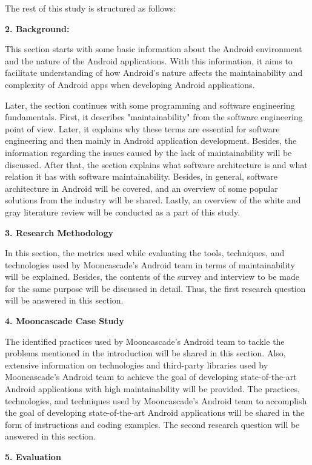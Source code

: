 The rest of this study is structured as follows:

\noindent\textbf{2. Background:}

This section starts with some basic information about the Android environment and the nature of the Android applications. With this information, it aims to facilitate understanding of how Android's nature affects the maintainability and complexity of Android apps when developing Android applications.

Later, the section continues with some programming and software engineering fundamentals. First, it describes "maintainability" from the software engineering point of view. Later, it explains why these terms are essential for software engineering and then mainly in Android application development. Besides, the information regarding the issues caused by the lack of maintainability will be discussed. After that, the section explains what software architecture is and what relation it has with software maintainability. Besides, in general, software architecture in Android will be covered, and an overview of some popular solutions from the industry will be shared. Lastly, an overview of the white and gray literature review will be conducted as a part of this study.

\noindent\textbf{3. Research Methodology}

In this section, the metrics used while evaluating the tools, techniques, and technologies used by Mooncascade's Android team in terms of maintainability will be explained. Besides, the contents of the survey and interview to be made for the same purpose will be discussed in detail. Thus, the first research question will be answered in this section.

\noindent\textbf{4. Mooncascade Case Study}

The identified practices used by Mooncascade's Android team to tackle the problems mentioned in the introduction will be shared in this section. Also, extensive information on technologies and third-party libraries used by Mooncascade's Android team to achieve the goal of developing state-of-the-art Android applications with high maintainability will be provided. The practices, technologies, and techniques used by Mooncascade's Android team to accomplish the goal of developing state-of-the-art Android applications will be shared in the form of instructions and coding examples. The second research question will be answered in this section.

\newpage
\noindent\textbf{5. Evaluation}

